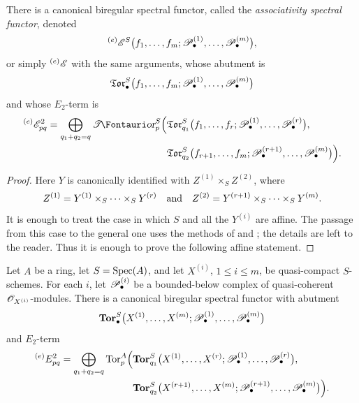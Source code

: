 \begin{proposition}[6.8.2]
\label{III.6.8.2}
There is a canonical biregular spectral functor, called the
\emph{associativity spectral functor}, denoted
\[
  {}^{(e)}\mathscr{E}^S
  \bigl(
    f_1,\ldots,f_m;
    \mathscr{P}_\bullet^{(1)},\ldots,\mathscr{P}_\bullet^{(m)}
  \bigr),
\]
or simply ${}^{(e)}\mathscr{E}$ with the same arguments, whose abutment
is
\[
  \mathfrak{Tor}_\bullet^S
  \bigl(
    f_1,\ldots,f_m;
    \mathscr{P}_\bullet^{(1)},\ldots,\mathscr{P}_\bullet^{(m)}
  \bigr)
\]
and whose $E_2$-term is
\[
\begin{split}
  {}^{(e)}\sh E_{pq}^2
  =
  \bigoplus_{q_1+q_2=q}
  \shTor_p^S
  \Bigl(
    &
    \mathfrak{Tor}_{q_1}^S
    \bigl(
      f_1,\ldots,f_r;
      \sh P_\bullet^{(1)},\ldots,\sh P_\bullet^{(r)}
    \bigr),
    \\
    &
    \mathfrak{Tor}_{q_2}^S
    \bigl(
      f_{r+1},\ldots,f_m;
      \sh P_\bullet^{(r+1)},\ldots,\sh P_\bullet^{(m)}
    \bigr)
  \Bigr).
\end{split}
\]
\end{proposition}

\begin{proof}
Here $Y$ is canonically identified with
$Z^{(1)}\times_SZ^{(2)}$, where
\[
  Z^{(1)}
  =
  Y^{(1)}\times_S\cdots\times_SY^{(r)}
  \quad\hbox{and}\quad
  Z^{(2)}
  =
  Y^{(r+1)}\times_S\cdots\times_SY^{(m)}.
\]
It is enough to treat the case in which $S$ and all the
$Y^{(i)}$ are affine.  The passage from this case to the general
one uses the methods of  and
; the details are left to the reader.  Thus it is
enough to prove the following affine statement.
\end{proof}

\begin{corollary}[6.8.3]
\label{III.6.8.3}
Let $A$ be a ring, let $S=\operatorname{Spec}(A)$, and let $X^{(i)}$,
$1\leq i\leq m$, be quasi-compact $S$-schemes.  For each $i$, let
$\mathscr{P}_\bullet^{(i)}$ be a bounded-below complex of
quasi-coherent $\mathscr{O}_{X^{(i)}}$-modules.  There is a canonical
biregular spectral functor with abutment
\[
  \mathbf{Tor}_\bullet^S
  \bigl(
    X^{(1)},\ldots,X^{(m)};
    \mathscr{P}_\bullet^{(1)},\ldots,\mathscr{P}_\bullet^{(m)}
  \bigr)
\]
and $E_2$-term
\[
\begin{split}
  {}^{(e)}E_{pq}^2
  =
  \bigoplus_{q_1+q_2=q}
  \operatorname{Tor}_p^A
  \Bigl(
    &
    \mathbf{Tor}_{q_1}^S
    \bigl(
      X^{(1)},\ldots,X^{(r)};
      \mathscr{P}_\bullet^{(1)},\ldots,\mathscr{P}_\bullet^{(r)}
    \bigr),
    \\
    &
    \mathbf{Tor}_{q_2}^S
    \bigl(
      X^{(r+1)},\ldots,X^{(m)};
      \mathscr{P}_\bullet^{(r+1)},\ldots,\mathscr{P}_\bullet^{(m)}
    \bigr)
  \Bigr).
\end{split}
\]
\end{corollary}

